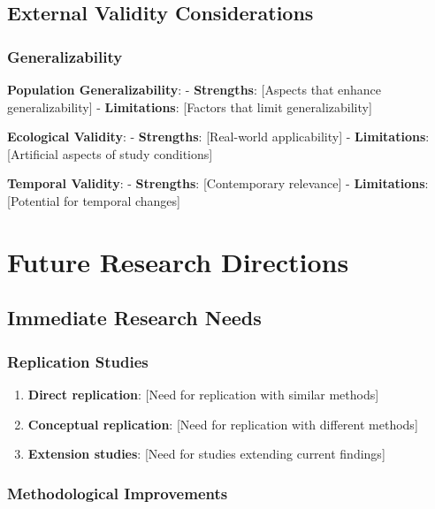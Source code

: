 \documentclass[
  12pt,
  letterpaper,
  12pt,
  letterpaper,
  oneside]{report}
\providecommand{\tightlist}{%
  \setlength{\itemsep}{0pt}\setlength{\parskip}{0pt}}
\begin{document}
\subsection{External Validity
Considerations}\label{external-validity-considerations}

\subsubsection{Generalizability}\label{generalizability}

\textbf{Population Generalizability}: - \textbf{Strengths}: {[}Aspects
that enhance generalizability{]} - \textbf{Limitations}: {[}Factors that
limit generalizability{]}

\textbf{Ecological Validity}: - \textbf{Strengths}: {[}Real-world
applicability{]} - \textbf{Limitations}: {[}Artificial aspects of study
conditions{]}

\textbf{Temporal Validity}: - \textbf{Strengths}: {[}Contemporary
relevance{]} - \textbf{Limitations}: {[}Potential for temporal
changes{]}

\section{Future Research Directions}\label{future-research-directions}

\subsection{Immediate Research Needs}\label{immediate-research-needs}

\subsubsection{Replication Studies}\label{replication-studies}

\begin{enumerate}
\def\labelenumi{\arabic{enumi}.}
\tightlist
\item
  \textbf{Direct replication}: {[}Need for replication with similar
  methods{]}
\item
  \textbf{Conceptual replication}: {[}Need for replication with
  different methods{]}
\item
  \textbf{Extension studies}: {[}Need for studies extending current
  findings{]}
\end{enumerate}

\subsubsection{Methodological
Improvements}\label{methodological-improvements}
\end{document}
